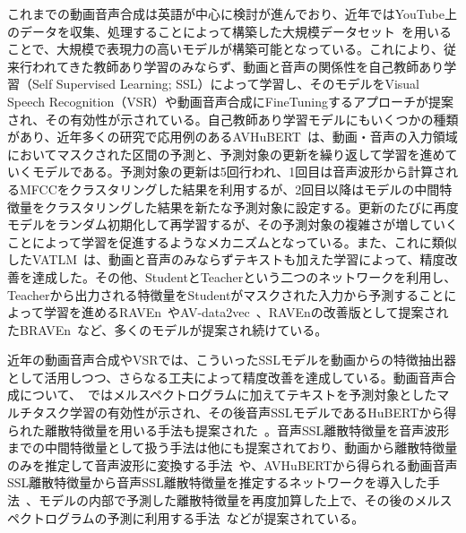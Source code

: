 \documentclass[12pt]{jarticle}
\numberwithin{equation}{section}    %
\numberwithin{figure}{section}      %
\numberwithin{table}{section}      %
\begin{document}
これまでの動画音声合成は英語が中心に検討が進んでおり、近年ではYouTube上のデータを収集、処理することによって構築した大規模データセット~\cite{afouras2018lrs3,chung2018voxceleb2}を用いることで、大規模で表現力の高いモデルが構築可能となっている。これにより、従来行われてきた教師あり学習のみならず、動画と音声の関係性を自己教師あり学習（Self Supervised Learning; SSL）によって学習し、そのモデルをVisual Speech Recognition（VSR）や動画音声合成にFineTuningするアプローチが提案され、その有効性が示されている。自己教師あり学習モデルにもいくつかの種類があり、近年多くの研究で応用例のあるAVHuBERT~\cite{shi2022learning}は、動画・音声の入力領域においてマスクされた区間の予測と、予測対象の更新を繰り返して学習を進めていくモデルである。予測対象の更新は5回行われ、1回目は音声波形から計算されるMFCCをクラスタリングした結果を利用するが、2回目以降はモデルの中間特徴量をクラスタリングした結果を新たな予測対象に設定する。更新のたびに再度モデルをランダム初期化して再学習するが、その予測対象の複雑さが増していくことによって学習を促進するようなメカニズムとなっている。また、これに類似したVATLM~\cite{zhu2023vatlm}は、動画と音声のみならずテキストも加えた学習によって、精度改善を達成した。その他、StudentとTeacherという二つのネットワークを利用し、Teacherから出力される特徴量をStudentがマスクされた入力から予測することによって学習を進めるRAVEn~\cite{haliassos2022jointly}やAV-data2vec~\cite{lian2023av}、RAVEnの改善版として提案されたBRAVEn~\cite{haliassos2024braven}など、多くのモデルが提案され続けている。

近年の動画音声合成やVSRでは、こういったSSLモデルを動画からの特徴抽出器として活用しつつ、さらなる工夫によって精度改善を達成している。動画音声合成について、~\cite{kim2023lip_multitask}ではメルスペクトログラムに加えてテキストを予測対象としたマルチタスク学習の有効性が示され、その後音声SSLモデルであるHuBERT\cite{hsu2021hubert}から得られた離散特徴量を用いる手法も提案された~\cite{choi2023intelligible}。音声SSL離散特徴量を音声波形までの中間特徴量として扱う手法は他にも提案されており、動画から離散特徴量のみを推定して音声波形に変換する手法~\cite{hsu2023revise}や、AVHuBERTから得られる動画音声SSL離散特徴量から音声SSL離散特徴量を推定するネットワークを導入した手法~\cite{sahipjohn2023robustl2s}、モデルの内部で予測した離散特徴量を再度加算した上で、その後のメルスペクトログラムの予測に利用する手法~\cite{kim2024let}などが提案されている。
\end{document}
